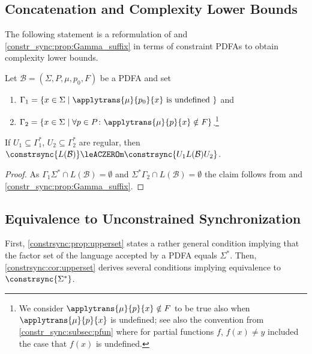 \subsection{Concatenation and Complexity Lower Bounds}
\label{constrsync:sec:constraut:concatlowerbounds}

The following statement is a reformulation 
of  and 
\cref{constr_sync:prop:Gamma_suffix}
in terms of constraint PDFAs to obtain
complexity lower bounds.

\begin{proposition}
	Let $\mathcal B = (\Sigma, P, \mu, p_0, F)$
	be a PDFA and set
	\begin{enumerate}
		\item $\Gamma_1 = \{ x \in \Sigma \mid \applytrans{\mu}{p_0}{x}\text{ is undefined } \}$ and
		
		\item $\Gamma_2 = \{ x \in \Sigma \mid \forall p \in P \colon \applytrans{\mu}{p}{x} \notin F \}$.\footnote{We consider $\applytrans{\mu}{p}{x} \notin F$
			to be true also when $\applytrans{\mu}{p}{x}$ is undefined;
see also the convention from \cref{constr_sync:subsec:pfun} 
where for partial functions $f$, $f(x) \ne y$ included the case that $f(x)$ is undefined.}
	\end{enumerate}	
	If $U_1 \subseteq \Gamma_1^*$,
	$U_2 \subseteq \Gamma_2^*$ are regular,
	then $\constrsync{L(\mathcal B)} \leACZEROm \constrsync{U_1 L(\mathcal B) U_2}$.		
\end{proposition}
\begin{proof}
	As $\Gamma_1 \Sigma^* \cap L(\mathcal B) = \emptyset$
	and $\Sigma^* \Gamma_2 \cap L(\mathcal B) = \emptyset$
	the claim follows from  
	and  \cref{constr_sync:prop:Gamma_suffix}.	
\end{proof}


\subsection{Equivalence to Unconstrained Synchronization} 
\label{constrsync:sec:constraut:unconstrained}

First, \cref{constrsync:prop:upperset} states
a rather general condition implying that the factor set
of the language accepted by a PDFA equals $\Sigma^*$.
Then, \cref{constrsync:cor:upperset}
derives several conditions implying equivalence
to $\constrsync{\Sigma^*}$.

